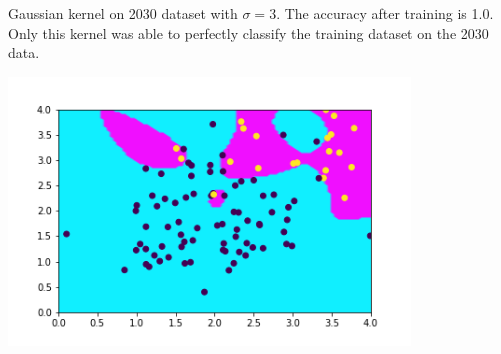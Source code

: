 \documentclass[newpage]{homework}
\begin{document}
\newpage Gaussian kernel on 2030 dataset with $\sigma=3$. The accuracy after training is 1.0. Only this kernel was able to perfectly classify the training dataset on the 2030 data.
\begin{center}
    \includegraphics[width=0.8\textwidth]{1div.png}
\end{center}
\end{document}
